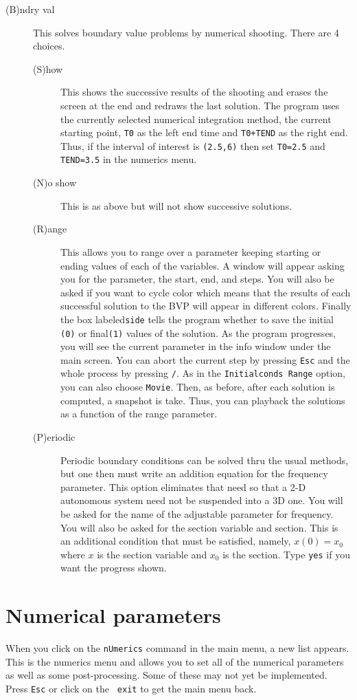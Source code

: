 \documentclass{article}
\newcommand{\tc}[1]{\addcontentsline{toc}{subsection}{#1}}
\begin{document}
\begin{description}
\tc{Boundary values}\item[(B)ndry val]  This solves boundary value problems by numerical shooting. There
 are 4 choices.
\begin{description}
\item[(S)how]  This shows the successive results of the shooting and
erases the screen at the end and redraws the last solution.  The program
 uses the currently selected numerical integration method, the current starting
 point, {\tt T0} as the left end time and  {\tt T0+TEND} as the right
end.
 Thus, if the
 interval of interest is {\tt (2.5,6)} then set {\tt T0=2.5} and {\tt
TEND=3.5} in the numerics menu.
\item[(N)o show] This is as above but will not show successive solutions.
\item[(R)ange]  This allows you to range over a parameter keeping starting or
 ending values of each of the variables.  A window will appear asking you for
 the parameter, the start, end, and steps.  You will also be asked if you want
to cycle color which means that the results of each successful solution to the
 BVP will appear in different colors. Finally the box labeled{\tt  side} tells the
 program whether to save the initial {\tt (0)} or final{\tt (1)}
values of
the solution.
 As the program progresses, you will see the current parameter in the info
 window under the main screen.  You can abort the current step by
pressing
 {\tt Esc}
and the whole process by pressing {\tt /}. As in the {\tt Initialconds
Range} option, you can also choose {\tt Movie}.  Then, as before,
after each solution is computed, a snapshot is take.  Thus, you can
playback the solutions as a function of the range parameter.

\item[(P)eriodic] Periodic boundary conditions can be solved thru the
usual methods, but one then must write an addition equation for the
frequency parameter.  This option eliminates that need so that a 2-D
autonomous system need not be suspended into a 3D one.  You will be
asked for the name of the adjustable parameter for frequency.  You
will also be asked for the section variable and section.  This is an additional
condition that must be satisfied, namely, $x(0)=x_0$ where $x$ is the
section variable and $x_0$ is the section.  Type {\tt yes} if you want
the progress shown.
\end{description}
\end{description}


\section{Numerical parameters}
When you click on the {\tt nUmerics} command in the main menu, a new
list appears.  This is the numerics menu and allows you to set all of
the numerical parameters as well as some post-processing.  Some of
these may not yet be implemented. Press {\tt Esc} or click on the {\tt
exit} to get the main menu back.
\end{document}
